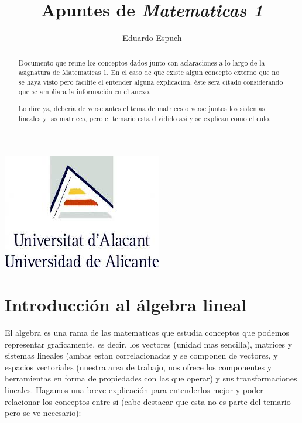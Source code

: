 \documentclass[11pt,a4paper]{article}
\author{Eduardo Espuch}
\title{Apuntes de \emph{Matematicas 1}}
\date{}
\begin{document}
\parskip=6pt
\maketitle

\begin{center}
\includegraphics[scale=0.6]{logoua}
\end{center}

\begin{abstract}
Documento que reune los conceptos dados junto con aclaraciones a lo largo de la asignatura de Matematicas 1. En el caso de que existe algun concepto externo que no se haya visto pero facilite el entender alguna explicacion, éste sera citado considerando que se ampliara la información en el anexo. 

Lo dire ya, deberia de verse antes el tema de matrices o verse juntos los sistemas lineales y las matrices, pero el temario esta dividido asi y se explican como el culo.
\end{abstract}


\begin{center}
\tableofcontents 
\end{center}
\newpage

\section{Introducción al álgebra lineal}

El algebra es una rama de las matematicas que estudia conceptos que podemos representar graficamente, es decir, los vectores (unidad mas sencilla), matrices y sistemas lineales (ambas estan correlacionadas y se componen de vectores, y espacios vectoriales (nuestra area de trabajo, nos ofrece los componentes y herramientas en forma de propiedades con las que operar) y sus transformaciones lineales. Hagamos una breve explicación para entenderlos mejor y poder relacionar los conceptos entre si (cabe destacar que esta no es parte del temario pero se ve necesario):
\end{document}
